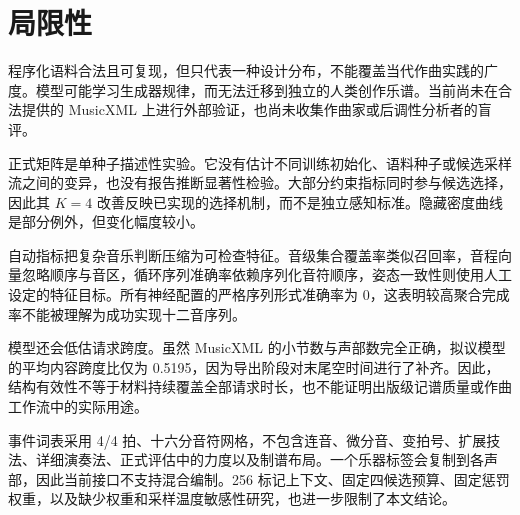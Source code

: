 \section{局限性}
\label{sec:limitations-zh}

程序化语料合法且可复现，但只代表一种设计分布，不能覆盖当代作曲实践的广度。模型可能学习生成器规律，而无法迁移到独立的人类创作乐谱。当前尚未在合法提供的 MusicXML 上进行外部验证，也尚未收集作曲家或后调性分析者的盲评。

正式矩阵是单种子描述性实验。它没有估计不同训练初始化、语料种子或候选采样流之间的变异，也没有报告推断显著性检验。大部分约束指标同时参与候选选择，因此其 $K=4$ 改善反映已实现的选择机制，而不是独立感知标准。隐藏密度曲线是部分例外，但变化幅度较小。

自动指标把复杂音乐判断压缩为可检查特征。音级集合覆盖率类似召回率，音程向量忽略顺序与音区，循环序列准确率依赖序列化音符顺序，姿态一致性则使用人工设定的特征目标。所有神经配置的严格序列形式准确率为 0，这表明较高聚合完成率不能被理解为成功实现十二音序列。

模型还会低估请求跨度。虽然 MusicXML 的小节数与声部数完全正确，拟议模型的平均内容跨度比仅为 0.5195，因为导出阶段对末尾空时间进行了补齐。因此，结构有效性不等于材料持续覆盖全部请求时长，也不能证明出版级记谱质量或作曲工作流中的实际用途。

事件词表采用 4/4 拍、十六分音符网格，不包含连音、微分音、变拍号、扩展技法、详细演奏法、正式评估中的力度以及制谱布局。一个乐器标签会复制到各声部，因此当前接口不支持混合编制。256 标记上下文、固定四候选预算、固定惩罚权重，以及缺少权重和采样温度敏感性研究，也进一步限制了本文结论。
